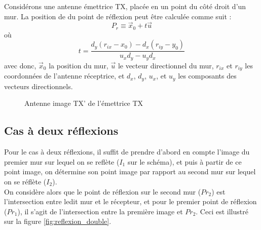 Consid{\'e}rons une antenne {\'e}mettrice TX, plac{\'e}e en un point du
c{\^o}t{\'e} droit d'un mur. La position de du point de réflexion peut être calculée comme suit :
\[ P_r \equiv \vec{x}_0 + t \vec{u} \]
o{\`u}
\[ t = \frac{d_y  (r_{ix} - x_0) - d_x  (r_{iy} - y_0)}{u_x d_y - u_y d_x} \]
avec donc, $\vec{x}_0$ la position du mur, $\vec{u}$ le vecteur directionnel
du mur, $r_{ix}$ et $r_{iy}$ les coordonn{\'e}es de l'antenne
r{\'e}ceptrice, et $d_x$, $d_y$, $u_x$, et $u_y$ les composants des
vecteurs directionnels.


\begin{figure}[H]
    \centering
    \caption{Antenne image TX' de l'émettrice TX}
    \label{fig:antenne_image}
\end{figure}
\subsection{Cas à deux réflexions}
Pour le cas à deux réflexions, il suffit de prendre d'abord en compte l'image du premier mur sur lequel on se reflète ($I_1$ sur le schéma), et puis à partir de ce point image, on détermine son point image par rapport au second mur sur lequel on se réflète ($I_2$). 
\\ On considère alors que le point de réflexion sur le second mur ($Pr_2$) est l'intersection entre ledit mur et le récepteur, et pour le premier point de réflexion ($Pr_{1}$), il s'agit de l'intersection entre la première image et $Pr_{2}$. 
Ceci est illustré sur la figure  \ref{fig:reflexion_double}.

